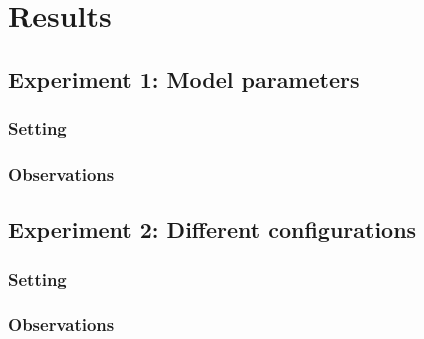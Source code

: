 \documentclass[11pt]{article}
\begin{document}
\section{Results}

\subsection{Experiment 1: Model parameters}

\subsubsection{Setting}

\subsubsection{Observations}

\subsection{Experiment 2: Different configurations}

\subsubsection{Setting}

\subsubsection{Observations}
\end{document}
